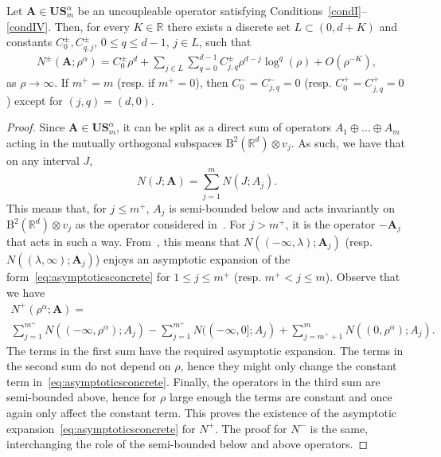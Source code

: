 \documentclass[AHL,Unicode,longabstracts,published]{cedram}
\newcommand{\RB}{\mathrm{B}}
\newcommand{\R}{\mathbb R}
\newcommand{\BA}{\mathbf A}
\newcommand{\BS}{\mathbf S}
\newcommand{\BU}{\mathbf U}
\newcommand{\pd}{uncoupleable}
\newcommand{\bigo}[1]{O\left(#1 \right)}
\begin{document}
\begin{prop}\label{thm:aexpconcreteu}
Let $\BA \in \BU\BS^{\alpha}_m$ be an \pd{} operator satisfying Conditions~\ref{condI}--\ref{condIV}. Then, for every $K \in \R$ there exists a discrete set $L \subset (0,d+K)$ and constants $C_0^\pm, C_{q,j}^\pm$, $0 \le q \le d-1$, $j \in L$, such that
\begin{equation}\label{eq:asymptoticsconcreteunc}
\begin{aligned}
N^\pm\left(\BA; \rho^\alpha \right) = C_0^\pm \rho^d +
\sum_{j\in L}\sum_{q =0}^{d-1} C_{j,q}^\pm \rho^{d-j} \log^q(\rho) + \bigo{\rho^{-K}},
\end{aligned}
\end{equation}
as $\rho \to \infty$. If $m^+ = m$ (resp. if $m^+ = 0$), then $C^-_0 = C^-_{j,q} = 0$ (resp. $C_0^+ = C^+_{j,q} = 0$) except for $(j,q) = (d,0)$.
\end{prop}
\begin{proof}
Since $\BA \in \BU\BS_m^\alpha$, it can be split as a direct sum of operators $A_1 \oplus \dotso \oplus A_m$ acting in the mutually orthogonal subspaces $\RB^2(\R^d) \otimes v_j$. As such, we have that on any interval $J$,
\begin{equation}\label{eq:sumIDS}
N(J;\BA) = \sum_{j=1}^m N(J;A_j).
\end{equation}
This means that, for $j\le m^+$, $A_j$ is semi-bounded below and acts invariantly on $\RB^2(\R^d) \otimes v_j$ as the operator considered in~\cite{MorParSht2014}. For $j > m^+$, it is the operator $-\BA_j$ that acts in such a way. From~\cite[Theorem~2.5]{MorParSht2014}, this means that $N((-
\infty,\lambda);\BA_j)$ (resp. $N((\lambda,\infty); \BA_j)$) enjoys an asymptotic expansion of the form~\eqref{eq:asymptoticsconcrete} for $1 \le j \le m^+$ (resp. $m^+ < j \le m$). Observe that we have
\begin{multline}\label{eq:sumIDSsplit}
N^+\left(\rho^\alpha;\BA\right)=\\ \sum_{j=1}^{m^+} N((-\infty,\rho^\alpha);A_j) - \sum_{j=1}^{m^+} N((-\infty,0];A_j)
+ \sum_{j=m^++1}^m N((0,\rho^\alpha);A_j).
\end{multline}
The terms in the first sum have the required asymptotic expansion. The terms in the second sum do not depend on $\rho$, hence they might only change the constant term in~\eqref{eq:asymptoticsconcrete}. Finally, the operators in the third sum are semi-bounded above, hence for $\rho$ large enough the terms are constant and once again only affect the constant term. This proves the existence of the asymptotic expansion~\eqref{eq:asymptoticsconcrete} for $N^+$. The proof for $N^-$ is the same, interchanging the role of the semi-bounded below and above operators.
\end{proof}
\end{document}
